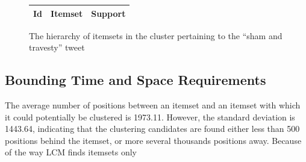 \documentclass[letterpaper,12pt,titlepage,oneside,final]{book}
\begin{document}
\begin{landscape}
\begin{figure}
\begin{tabular}{p{0.8cm}p{17.5cm}p{2cm}}
Id & Itemset &  Support\\ \hline
\end{tabular}
\caption{The hierarchy of itemsets in the cluster pertaining to the ``sham and travesty'' tweet}
\label{fig:hierSham}
\end{figure}
\end{landscape}


\subsection{Bounding Time and Space Requirements}
The average number of positions  between an itemset  %
and an itemset with which it could potentially be clustered 
is 1973.11.
However, the standard deviation is 1443.64, 
indicating that the clustering candidates are 
found either %
less than 500 positions behind
the itemset, or more several thousands positions away.
Because of the way LCM finds itemsets
only 
\end{document}

